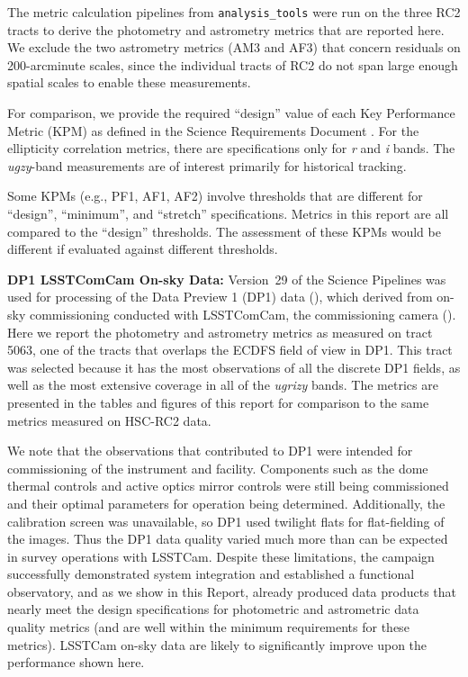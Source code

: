 \documentclass[DM,toc,lsstdraft]{lsstdoc}
\begin{document}
The metric calculation pipelines from \texttt{analysis\_tools} were run on the three RC2 tracts to derive the photometry and astrometry metrics that are reported here. We exclude the two astrometry metrics (AM3 and AF3) that concern residuals on 200-arcminute scales, since the individual tracts of RC2 do not span large enough spatial scales to enable these measurements.

For comparison, we provide the \SRD required ``design'' value of each Key Performance Metric (KPM) as defined in the Science Requirements Document . For the ellipticity correlation metrics, there are specifications only for \emph{r} and \emph{i} bands. The \emph{ugzy}-band measurements are of interest primarily for historical tracking.

Some KPMs (e.g., PF1, AF1, AF2) involve thresholds that are different for ``design'', ``minimum'', and ``stretch'' specifications. Metrics in this report are all compared to the ``design'' thresholds. The assessment of these KPMs would be different if evaluated against different thresholds.

\textbf{DP1 LSSTComCam On-sky Data:} Version~29 of the Science Pipelines was used for processing of the Data Preview 1 (DP1) data (), which derived from on-sky commissioning conducted with LSSTComCam, the commissioning camera (). Here we report the photometry and astrometry metrics as measured on tract 5063, one of the tracts that overlaps the ECDFS field of view in DP1. This tract was selected because it has the most observations of all the discrete DP1 fields, as well as the most extensive coverage in all of the \textit{ugrizy} bands. The metrics are presented in the tables and figures of this report for comparison to the same metrics measured on HSC-RC2 data.

We note that the observations that contributed to DP1 were intended for commissioning of the instrument and facility. Components such as the dome thermal controls and active optics mirror controls were still being commissioned and their optimal parameters for operation being determined. Additionally, the calibration screen was unavailable, so DP1 used twilight flats for flat-fielding of the images. Thus the DP1 data quality varied much more than can be expected in survey operations with LSSTCam. Despite these limitations, the campaign successfully demonstrated system integration and established a functional observatory, and as we show in this Report, already produced data products that nearly meet the design specifications for photometric and astrometric data quality metrics (and are well within the minimum requirements for these metrics). LSSTCam on-sky data are likely to significantly improve upon the performance shown here.
\end{document}
